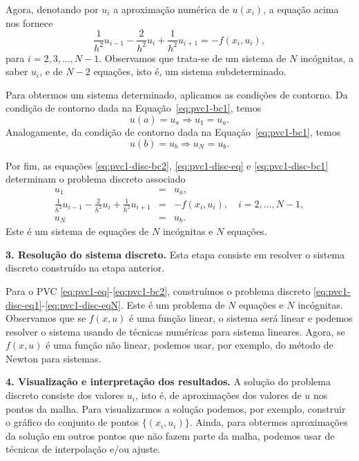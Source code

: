 Agora, denotando por $u_i$ a aproximação numérica de $u(x_i)$, a equação acima nos fornece
\begin{equation}\label{eq:pvc1-disc-eq}
\frac{1}{h^2}u_{i-1} - \frac{2}{h^2}u_i + \frac{1}{h^2}u_{i+1} = -f(x_i, u_i),
\end{equation}
para $i=2, 3, \dotsc, N-1$. Observamos que trata-se de um sistema de $N$ incógnitas, a saber $u_i$, e de $N-2$ equações, isto é, um sistema subdeterminado.

Para obtermos um sistema determinado, aplicamos as condições de contorno. Da condição de contorno dada na Equação~\eqref{eq:pvc1-bc1}, temos
\begin{equation}\label{eq:pvc1-disc-bc1}
  u(a) = u_a\Rightarrow u_1 = u_a.
\end{equation}
Analogamente, da condição de contorno dada na Equação~\eqref{eq:pvc1-bc1}, temos
\begin{equation}\label{eq:pvc1-disc-bc2}
  u(b) = u_b\Rightarrow u_N = u_b.
\end{equation}

Por fim, as equações \eqref{eq:pvc1-disc-bc2}, \eqref{eq:pvc1-disc-eq} e \eqref{eq:pvc1-disc-bc1} determinam o problema discreto associado
\begin{eqnarray}
  u_1 &=& u_a,\label{eq:pvc1-disc-eq1}\\
  \frac{1}{h^2}u_{i-1} - \frac{2}{h^2}u_i + \frac{1}{h^2}u_{i+1} &=& -f(x_i, u_i),\quad i=2, \dotsc, N-1,\label{eq:pvc1-disc-eqi}\\
  u_N &=& u_b.\label{eq:pvc1-disc-eqN}
\end{eqnarray}
Este é um sistema de equações de $N$ incógnitas e $N$ equações.

{\bf 3. Resolução do sistema discreto.} Esta etapa consiste em resolver o sistema discreto construído na etapa anterior. 

Para o PVC \eqref{eq:pvc1-eq}-\eqref{eq:pvc1-bc2}, construímos o problema discreto \eqref{eq:pvc1-disc-eq1}-\eqref{eq:pvc1-disc-eqN}. Este é um problema de $N$ equações e $N$ incógnitas. Observamos que se $f(x, u)$ é uma função linear, o sistema será linear e podemos resolver o sistema usando de técnicas numéricas para sistema lineares. Agora, se $f(x, u)$ é uma função não linear, podemos usar, por exemplo, do método de Newton para sistemas.

{\bf 4. Visualização e interpretação dos resultados.} A solução do problema discreto consiste dos valores $u_i$, isto é, de aproximações dos valores de $u$ nos pontos da malha. Para visualizarmos a solução podemos, por exemplo, construir o gráfico do conjunto de pontos $\{(x_i, u_i)\}$. Ainda, para obtermos aproximações da solução em outros pontos que não fazem parte da malha, podemos usar de técnicas de interpolação e/ou ajuste.

